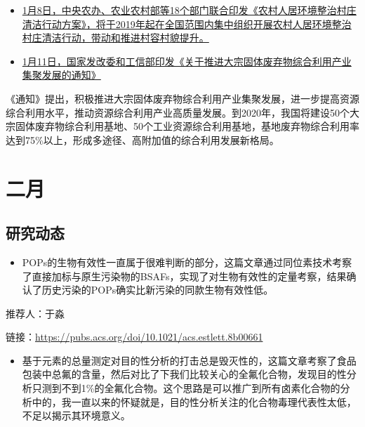 \documentclass[
]{book}
\providecommand{\tightlist}{%
  \setlength{\itemsep}{0pt}\setlength{\parskip}{0pt}}
\begin{document}
\begin{itemize}
\item
  \href{http://www.jxwst.gov.cn/doc/2019/01/08/122304.shtml}{1月8日，中央农办、农业农村部等18个部门联合印发《农村人居环境整治村庄清洁行动方案》，将于2019年起在全国范围内集中组织开展农村人居环境整治村庄清洁行动，带动和推进村容村貌提升。}
\item
  \href{http://www.miit.gov.cn/n1146285/n1146352/n3054355/n3057542/n3057545/c6589680/content.html}{1月11日，国家发改委和工信部印发《关于推进大宗固体废弃物综合利用产业集聚发展的通知》}
\end{itemize}

《通知》提出，积极推进大宗固体废弃物综合利用产业集聚发展，进一步提高资源综合利用水平，推动资源综合利用产业高质量发展。到2020年，我国将建设50个大宗固体废弃物综合利用基地、50个工业资源综合利用基地，基地废弃物综合利用率达到75\%以上，形成多途径、高附加值的综合利用发展新格局。

\hypertarget{ux4e8cux6708-1}{%
\section*{二月}\label{ux4e8cux6708-1}}

\hypertarget{ux7814ux7a76ux52a8ux6001-15}{%
\subsection*{研究动态}\label{ux7814ux7a76ux52a8ux6001-15}}

\begin{itemize}
\tightlist
\item
  POPs的生物有效性一直属于很难判断的部分，这篇文章通过同位素技术考察了直接加标与原生污染物的BSAFs，实现了对生物有效性的定量考察，结果确认了历史污染的POPs确实比新污染的同款生物有效性低。
\end{itemize}

推荐人：于淼

链接：\url{https://pubs.acs.org/doi/10.1021/acs.estlett.8b00661}

\begin{itemize}
\tightlist
\item
  基于元素的总量测定对目的性分析的打击总是毁灭性的，这篇文章考察了食品包装中总氟的含量，然后对比了下我们比较关心的全氟化合物，发现目的性分析只测到不到1\%的全氟化合物。这个思路是可以推广到所有卤素化合物的分析中的，我一直以来的怀疑就是，目的性分析关注的化合物毒理代表性太低，不足以揭示其环境意义。
\end{itemize}
\end{document}
